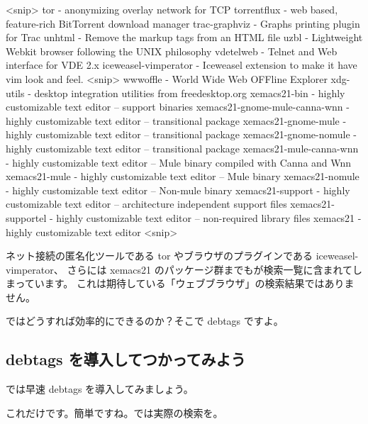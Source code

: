 \documentclass[mingoth,a4paper]{jsarticle}
\begin{document}
\begin{commandline}
<snip>
tor - anonymizing overlay network for TCP
torrentflux - web based, feature-rich BitTorrent download manager
trac-graphviz - Graphs printing plugin for Trac
unhtml - Remove the markup tags from an HTML file
uzbl - Lightweight Webkit browser following the UNIX philosophy
vdetelweb - Telnet and Web interface for VDE 2.x
iceweasel-vimperator - Iceweasel extension to make it have vim look and feel.
<snip>
wwwoffle - World Wide Web OFFline Explorer
xdg-utils - desktop integration utilities from freedesktop.org
xemacs21-bin - highly customizable text editor -- support binaries
xemacs21-gnome-mule-canna-wnn - highly customizable text editor -- transitional package
xemacs21-gnome-mule - highly customizable text editor -- transitional package
xemacs21-gnome-nomule - highly customizable text editor -- transitional package
xemacs21-mule-canna-wnn - highly customizable text editor -- Mule binary compiled with Canna and Wnn
xemacs21-mule - highly customizable text editor -- Mule binary
xemacs21-nomule - highly customizable text editor -- Non-mule binary
xemacs21-support - highly customizable text editor -- architecture independent support files
xemacs21-supportel - highly customizable text editor -- non-required library files
xemacs21 - highly customizable text editor
<snip>
\end{commandline}

ネット接続の匿名化ツールである tor やブラウザのプラグインである iceweasel-vimperator、
さらには xemacs21 のパッケージ群までもが検索一覧に含まれてしまっています。
これは期待している「ウェブブラウザ」の検索結果ではありません。

ではどうすれば効率的にできるのか？そこで debtags ですよ。

\subsection{debtags を導入してつかってみよう}
では早速 debtags を導入してみましょう。
これだけです。簡単ですね。では実際の検索を。
\end{document}
